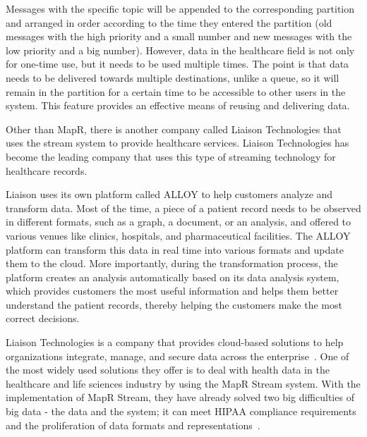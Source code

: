\begin{itemize}
Messages with the specific topic will be appended 
to the corresponding partition 
and arranged in order according to the time they 
entered the partition 
(old messages with the high priority and a small 
number and new messages with
 the low priority and a big number). However, 
 data in the healthcare field is 
not only for one-time use, but it needs to be used 
multiple times. The point 
is that data needs to be delivered towards multiple 
destinations, unlike a queue,
so it will remain in the partition for a certain time to 
be accessible to
other users in the system. This feature provides an 
effective means 
of reusing and delivering data.

\end{itemize}

Other than MapR, there is another company 
called Liaison 
Technologies that uses the stream system to 
provide healthcare services. 
Liaison Technologies has 
become the leading company that uses this type of streaming 
technology for healthcare records.

Liaison uses its own platform called ALLOY to help 
customers analyze and transform data. Most of the time, 
a piece of a patient record needs to be observed 
in different formats, 
such as a graph, a document, or an 
analysis, and offered to various venues like clinics, 
hospitals, 
and pharmaceutical facilities. 
The ALLOY platform can transform this data in 
real time into 
various formats and update them 
to the cloud. More importantly, during the 
transformation process, the 
platform creates an analysis automatically 
based on its data analysis system, 
which provides customers the most useful 
information and helps 
them better understand the 
patient records, thereby helping the customers 
make the most 
correct decisions. 

Liaison Technologies is a company that provides cloud-based 
solutions to help 
organizations integrate, manage, and secure data across the 
enterprise~\cite{23}. One of the most widely used solutions 
they offer is to deal with 
health data in the healthcare 
and life sciences industry by using the MapR Stream system. 
With the implementation of MapR Stream, they have 
already solved two big difficulties of big data - the data and the 
system; it can meet 
HIPAA compliance requirements and the proliferation 
of data formats and representations~\cite{23}. 

